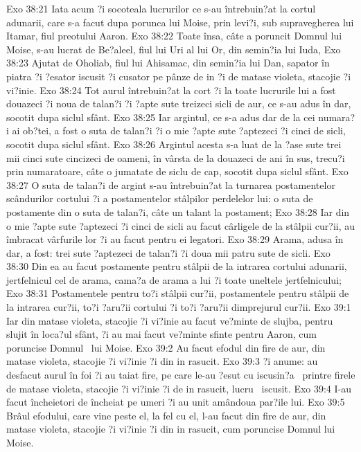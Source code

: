 Exo 38:21  Iata acum ?i socoteala lucrurilor ce s-au întrebuin?at la cortul adunarii, care s-a facut dupa porunca lui Moise, prin levi?i, sub supravegherea lui Itamar, fiul preotului Aaron.
Exo 38:22  Toate însa, câte a poruncit Domnul lui Moise, s-au lucrat de Be?aleel, fiul lui Uri al lui Or, din semin?ia lui Iuda,
Exo 38:23  Ajutat de Oholiab, fiul lui Ahisamac, din semin?ia lui Dan, sapator în piatra ?i ?esator iscusit ?i cusator pe pânze de in ?i de matase violeta, stacojie ?i vi?inie.
Exo 38:24  Tot aurul întrebuin?at la cort ?i la toate lucrurile lui a fost douazeci ?i noua de talan?i ?i ?apte sute treizeci sicli de aur, ce s-au adus în dar, socotit dupa siclul sfânt.
Exo 38:25  Iar argintul, ce s-a adus dar de la cei numara?i ai ob?tei, a fost o suta de talan?i ?i o mie ?apte sute ?aptezeci ?i cinci de sicli, socotit dupa siclul sfânt.
Exo 38:26  Argintul acesta s-a luat de la ?ase sute trei mii cinci sute cincizeci de oameni, în vârsta de la douazeci de ani în sus, trecu?i prin numaratoare, câte o jumatate de siclu de cap, socotit dupa siclul sfânt.
Exo 38:27  O suta de talan?i de argint s-au întrebuin?at la turnarea postamentelor scândurilor cortului ?i a postamentelor stâlpilor perdelelor lui: o suta de postamente din o suta de talan?i, câte un talant la postament;
Exo 38:28  Iar din o mie ?apte sute ?aptezeci ?i cinci de sicli au facut cârligele de la stâlpii cur?ii, au îmbracat vârfurile lor ?i au facut pentru ei legatori.
Exo 38:29  Arama, adusa în dar, a fost: trei sute ?aptezeci de talan?i ?i doua mii patru sute de sicli.
Exo 38:30  Din ea au facut postamente pentru stâlpii de la intrarea cortului adunarii, jertfelnicul cel de arama, cama?a de arama a lui ?i toate uneltele jertfelnicului;
Exo 38:31  Postamentele pentru to?i stâlpii cur?ii, postamentele pentru stâlpii de la intrarea cur?ii, to?i ?aru?ii cortului ?i to?i ?aru?ii dimprejurul cur?ii.
Exo 39:1  Iar din matase violeta, stacojie ?i vi?inie au facut ve?minte de slujba, pentru slujit în loca?ul sfânt, ?i au mai facut ve?minte sfinte pentru Aaron, cum poruncise Domnul  lui Moise.
Exo 39:2  Au facut efodul din fire de aur, din matase violeta, stacojie ?i vi?inie ?i din in rasucit.
Exo 39:3  ?i anume: au desfacut aurul în foi ?i au taiat fire, pe care le-au ?esut cu iscusin?a  printre firele de matase violeta, stacojie ?i vi?inie ?i de in rasucit, lucru  iscusit.
Exo 39:4  I-au facut încheietori de încheiat pe umeri ?i au unit amândoua par?ile lui.
Exo 39:5  Brâul efodului, care vine peste el, la fel cu el, l-au facut din fire de aur, din matase violeta, stacojie ?i vi?inie ?i din in rasucit, cum poruncise Domnul lui Moise.
